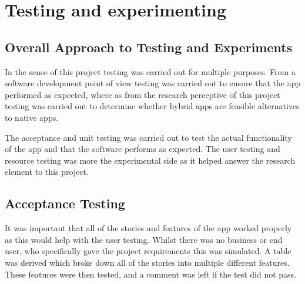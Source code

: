 \chapter{Testing and experimenting}


\section{Overall Approach to Testing and Experiments}
In the sense of this project testing was carried out for multiple purposes. From a software development point of view testing was carried out to ensure that the app performed as expected, where as from the research perceptive of this project testing was carried out to determine whether hybrid apps are feasible alternatives to native apps.

The acceptance and unit testing was carried out to test the actual functionality of the app and that the software performs as expected. The user testing and resource testing was more the experimental side as it helped answer the research element to this project.

\section{Acceptance Testing}
It was important that all of the stories and features of the app worked properly as this would help with the user testing. Whilst there was no business or end user, who specifically gave the project requirements this was simulated. A table was derived which broke down all of the stories into multiple different features. These features were then tested, and a comment was left if the test did not pass.

